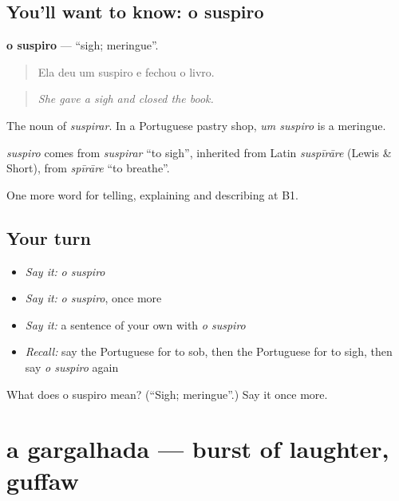 \subsection*{You'll want to know: o suspiro}
\textbf{o suspiro} — \textquotedblleft{}sigh; meringue\textquotedblright{}.

\begin{quote}
Ela deu um suspiro e fechou o livro.
\end{quote}

\begin{quote}
\emph{She gave a sigh and closed the book.}
\end{quote}

The noun of \emph{suspirar}. In a Portuguese pastry shop, \emph{um suspiro} is a meringue.

\begin{cousinweb}
\emph{suspiro} comes from \emph{suspirar} \textquotedblleft{}to sigh\textquotedblright{}, inherited from Latin \emph{suspīrāre} (Lewis \& Short), from \emph{spīrāre} \textquotedblleft{}to breathe\textquotedblright{}.
\end{cousinweb}

\begin{grammarlens}[title={What you've built}]
One more word for telling, explaining and describing at B1.
\end{grammarlens}

\subsection*{Your turn}
\begin{itemize}
\raggedright
  \item \emph{Say it:} \emph{o suspiro}
  \item \emph{Say it:} \emph{o suspiro}, once more
  \item \emph{Say it:} a sentence of your own with \emph{o suspiro}
  \item \emph{Recall:} say the Portuguese for to sob, then the Portuguese for to sigh, then say \emph{o suspiro} again
\end{itemize}

\begin{tcolorbox}[breakable,colback=teal!4,colframe=teal!35!black,title={Before you move on}]
What does o suspiro mean? (\textquotedblleft{}Sigh; meringue\textquotedblright{}.) Say it once more.
\end{tcolorbox}
\section[a gargalhada]{a gargalhada — burst of laughter, guffaw}

